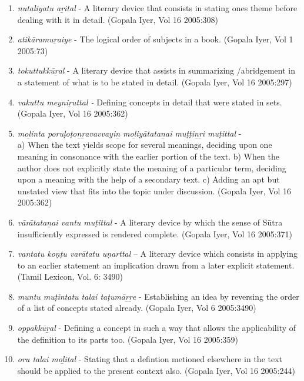 \begin{enumerate}
\itemsep=3pt
\item \textit{nutaliyatu aṟital} - A literary device that consists in stating ones theme before dealing with it in detail. (Gopala Iyer, Vol 16 2005:308)

 \item \textit{atikāramuṟaiye} - The logical order of subjects in a book. (Gopala Iyer, Vol 1 2005:73)

 \item \textit{tokuttukkūṟal} - A literary device that assists in summarizing /abridgement in a statement of what is to be stated in detail. (Gopala Iyer, Vol 16 2005:297)

 \item \textit{vakuttu meyniṟuttal -} Defining concepts in detail that were stated in sets. (Gopala Iyer, Vol 16 2005:362)

 \item \textit{moḻinta poruḷoṭoṉṟavavvayiṉ moḻiyātataṉai muṭṭiṉṟi muṭittal} -\\ a) When the text yields scope for several meanings, deciding upon one meaning in consonance with the earlier portion of the text. b) When the author does not explicitly state the meaning of a particular term, deciding upon a meaning with the help of a secondary text. c) Adding an apt but unstated view that fits into the topic under discussion. (Gopala Iyer, Vol 16 2005:362)

 \item \textit{vārātataṉai vantu muṭittal} - A literary device by which the sense of Sūtra insufficiently expressed is rendered complete. (Gopala Iyer, Vol 16 2005:371)

 \item \textit{vantatu koṇṭu varātatu uṇarttal} – A literary device which consists in applying to an earlier statement an implication drawn from a later explicit statement. (Tamil Lexicon, Vol. 6: 3490)

 \item \textit{muntu muṭintatu talai taṭumāṟṟe} - Establishing an idea by reversing the order of a list of concepts stated already. (Gopala Iyer, Vol 6 2005:3490)

 \item \textit{oppakkūṟal} - Defining a concept in such a way that allows the applicability of the definition to its parts too. (Gopala Iyer, Vol 16 2005:359)

 \item \textit{oru talai moḻital} - Stating that a defintion metioned elsewhere in the text should be applied to the present context also. (Gopala Iyer, Vol 16 2005:244)


\end{enumerate}
